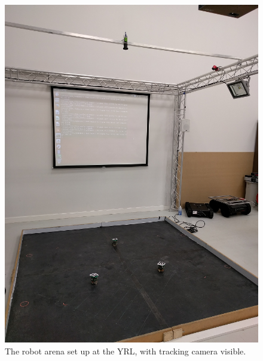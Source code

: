 \begin{figure}
	\centering
	\includegraphics[scale=0.4]{Figures/ArenaPhoto.png}
	\decoRule
	\caption[Robot Arena and Tracking Camera]{The robot arena set up at the YRL, with tracking camera visible.}
	\label{fig:ArenaPhoto}
\end{figure}


